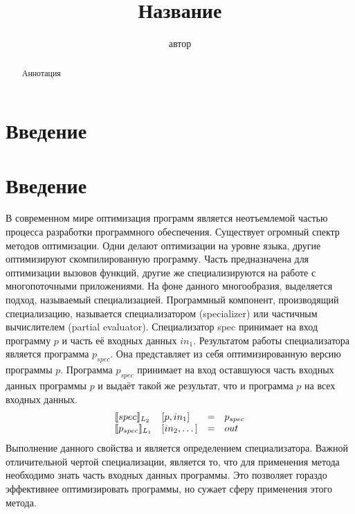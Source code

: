 
\lstset{escapechar=@,style=mycode}


\title{Название}


\author{автор}



\maketitle

\begin{abstract}
Аннотация
\end{abstract}


\section*{Введение}
\tableofcontents

\section*{Введение}
В современном мире оптимизация программ является неотъемлемой частью процесса разработки программного обеспечения. Существует огромный спектр методов оптимизации. Одни делают оптимизации на уровне языка, другие оптимизируют скомпилированную программу. Часть предназначена для оптимизации вызовов функций, другие же специализируются на работе с многопоточными приложениями. На фоне данного многообразия, выделяется подход, называемый специализацией. Программный компонент, производящий специализацию, называется специализатором (specializer) или частичным вычислителем (partial evaluator). Специализатор spec принимает на вход программу $p$ и часть её входных данных $in_1$. Результатом работы специализатора является программа $p_{spec}$. Она представляет из себя оптимизированную версию программы $p$. Программа $p_{spec}$ принимает на вход оставшуюся часть входных данных программы $p$ и выдаёт такой же результат, что и программа $p$ на всех входных данных. 
$$\begin{array}{l l c l}
        \llbracket spec \rrbracket_{L_2} & [p, in_1] &= &p_{spec}\\
        \llbracket p_{spec} \rrbracket_{L_1} & [in_2 ,\dots] &= &out
      \end{array}$$
Выполнение данного свойства и является определением специализатора. Важной отличительной чертой специализации, является то, что для применения метода необходимо знать часть входных данных программы. Это позволяет гораздо эффективнее оптимизировать программы, но сужает сферу применения этого метода.


